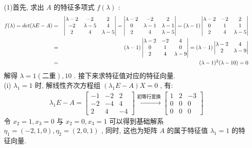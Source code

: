 \documentclass[11pt,a4paper,openany,oneside]{book}
\begin{document}
(1)首先, 求出 $ A $ 的特征多项式 $ f(\lambda) $ :
\begin{eqnarray}
f(\lambda) = det(\lambda E-A) &=&
\begin{vmatrix}
\lambda-2  &  -2  &  2    \\
-2  & \lambda-5  &  4   \\
2  &  4  &  \lambda-5
\end{vmatrix}=
\begin{vmatrix}
\lambda-2  &  -2  &  2    \\
0  &  \lambda-1  &  \lambda-1  \\
2  &  4  &  \lambda-5
\end{vmatrix} =(\lambda-1)
\begin{vmatrix}
\lambda-2  &  -2  &  2    \\
0  &  1  &  1  \\
2  &  4  &  \lambda-5
\end{vmatrix} \notag\\
&=&(\lambda-1)
\begin{vmatrix}
\lambda-2  &  -2  &  4  \\
0  &  1  &  0  \\
2  &  4  &  \lambda -9 
\end{vmatrix}=(\lambda-1)
\begin{vmatrix}
\lambda-2  &  4  \\
2  &  \lambda -9 \\
\end{vmatrix} \notag\\
&=&
(\lambda-1)^2(\lambda-10)=0  \notag
\end{eqnarray}
解得 $ \lambda=1(\text{二重}), 10 $ . 接下来求特征值对应的特征向量. \\

(i) $ \lambda_1 = 1 $ 时, 解线性齐次方程组 $ (\lambda_1E -A)X = 0 $ , 有:
\begin{gather*}
\lambda_1E - A =
\begin{bmatrix}
-1  &  -2  &  2  \\
-2  &  -4  &  4  \\
2  &  4  &  -4  
\end{bmatrix} \xrightarrow{初等行变换}
\begin{bmatrix}
1  &  2  &  -3  \\
0  &  0  &  0  \\
0  &  0  &  0
\end{bmatrix}
\end{gather*}
令 $ x_2 = 1, x_3 = 0 $ 与 $ x_2 = 0, x_3 =1 $ 可以得到基础解系 $ \eta_1 = (-2, 1, 0), \eta_2=(2, 0, 1) $ , 同时, 这也为矩阵 $ A $ 的属于特征值 $ \lambda_1 = 1 $ 的特征向量. \\
\end{document}
